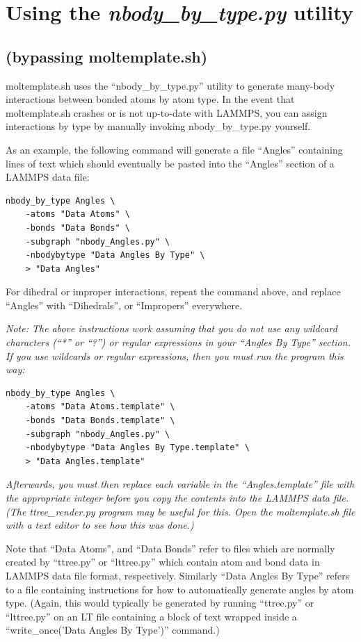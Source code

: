 \documentclass[11pt]{article}
\begin{document}
\section{Using the \textit{nbody\_by\_type.py} utility}
\subsection*{(bypassing moltemplate.sh)}
\label{sec:nbody_by_type_utility}

moltemplate.sh uses the ``nbody\_by\_type.py'' utility 
to generate many-body interactions between bonded atoms
by atom type.
In the event that moltemplate.sh crashes or is not up-to-date with LAMMPS,
you can assign interactions by type by manually invoking nbody\_by\_type.py
yourself.


As an example, the following command will generate a file ``Angles''
containing lines of text which should eventually be pasted into the ``Angles''
section of a LAMMPS data file:
\begin{verbatim}
nbody_by_type Angles \
    -atoms "Data Atoms" \
    -bonds "Data Bonds" \
    -subgraph "nbody_Angles.py" \
    -nbodybytype "Data Angles By Type" \
    > "Data Angles"
\end{verbatim}

For dihedral or improper interactions, repeat the command above, and 
replace ``Angles'' with ``Dihedrals'', or ``Impropers'' everywhere.

\textit{Note:
The above instructions work assuming that you do not use any 
wildcard characters (``*'' or ``?'') 
or regular expressions 
in your ``Angles By Type'' section.
If you use wildcards or regular expressions, 
then you must run the program this way:
}
\begin{verbatim}
nbody_by_type Angles \
    -atoms "Data Atoms.template" \
    -bonds "Data Bonds.template" \
    -subgraph "nbody_Angles.py" \
    -nbodybytype "Data Angles By Type.template" \
    > "Data Angles.template"
\end{verbatim}
\textit{
Afterwards, you must then replace each variable in the 
``Angles.template'' file with the appropriate integer 
before you copy the contents into the LAMMPS data file.
(The ttree\_render.py program may be useful for this.
 Open the moltemplate.sh file with a text editor to 
 see how this was done.)
}

Note that ``Data Atoms'', and ``Data Bonds'' refer to files which are normally
created by ``ttree.py'' or ``lttree.py'' which
contain atom and bond data in LAMMPS data file format, respectively.
Similarly ``Data Angles By Type'' refers to a file 
containing instructions for how to automatically generate angles by atom type.
(Again, this would typically be generated by running ``ttree.py'' or 
 ``lttree.py'' on an LT file containing a block of text wrapped 
 inside a ``write\_once('Data Angles By Type')'' command.)
\end{document}
